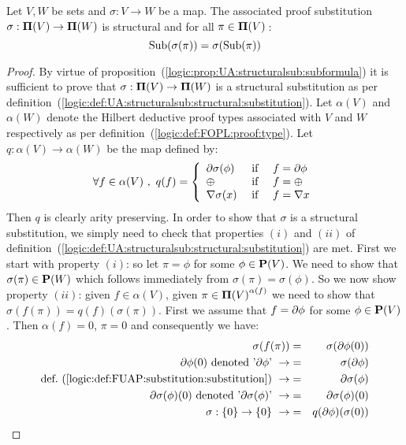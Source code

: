 \begin{prop}\label{logic:prop:FUAP:substitution:subformula}
Let $V,W$ be sets and $\sigma:V\to W$ be a map. The associated proof
substitution $\sigma:\mbox{${\bf\Pi}(V)$}\to{\bf\Pi}(W)$ is structural and for all
$\pi\in\mbox{${\bf\Pi}(V)$}$\,:
    \[
    \mbox{\rm Sub}(\sigma(\pi))=\sigma(\mbox{\rm Sub}(\pi))
    \]
\end{prop}
\begin{proof}
By virtue of
proposition~(\ref{logic:prop:UA:structuralsub:subformula}) it is
sufficient to prove that $\sigma:\mbox{${\bf\Pi}(V)$}\to{\bf\Pi}(W)$ is a structural
substitution as per
definition~(\ref{logic:def:UA:structuralsub:structural:substitution}).
Let $\alpha(V)$ and $\alpha(W)$ denote the Hilbert deductive proof
types associated with $V$ and $W$ respectively as per
definition~(\ref{logic:def:FOPL:proof:type}). Let
$q:\alpha(V)\to\alpha(W)$ be the map defined by:
    \[
    \forall f\in\alpha(V)\ ,\ q(f)=\left\{
        \begin{array}{lcl}
        \mbox{$\partial$}\sigma(\phi)&\mbox{\ if\ }&f=\mbox{$\partial$}\phi\\
        \mbox{$\oplus$}&\mbox{\ if\ }&f=\mbox{$\oplus$}\\
        \mbox{$\nabla$}\sigma(x)&\mbox{\ if\ }&f=\mbox{$\nabla$} x
        \end{array}
    \right.
    \]
Then $q$ is clearly arity preserving. In order to show that $\sigma$
is a structural substitution, we simply need to check that
properties $(i)$ and $(ii)$ of
definition~(\ref{logic:def:UA:structuralsub:structural:substitution})
are met. First we start with property $(i)$: so let $\pi=\phi$ for
some $\phi\in\mbox{${\bf P}(V)$}$. We need to show that $\sigma(\pi)\in{\bf P}(W)$
which follows immediately from $\sigma(\pi)=\sigma(\phi)$. So we now
show property $(ii)$: given $f\in\alpha(V)$, given
$\pi\in\mbox{${\bf\Pi}(V)$}^{\alpha(f)}$ we need to show that
$\sigma(f(\pi))=q(f)(\sigma(\pi))$. First we assume that
$f=\mbox{$\partial$}\phi$ for some $\phi\in\mbox{${\bf P}(V)$}$. Then $\alpha(f)=0$, $\pi=0$ and
consequently we have:
    \begin{eqnarray*}
    \sigma(f(\pi))&=&\sigma(\axi\phi(0))\\
    \mbox{$\axi\phi(0)$ denoted '$\axi\phi$'}\ \rightarrow&=&\sigma(\axi\phi)\\
    \mbox{def.~(\ref{logic:def:FUAP:substitution:substitution})}\ \rightarrow
    &=&\axi\sigma(\phi)\\
    \mbox{$\axi\sigma(\phi)(0)$ denoted '$\axi\sigma(\phi)$'}\ \rightarrow
    &=&\axi\sigma(\phi)(0)\\
    \sigma:\{0\}\to\{0\}\ \rightarrow&=&q(\axi\phi)(\sigma(0))\\

\end{eqnarray*}
\end{proof}
